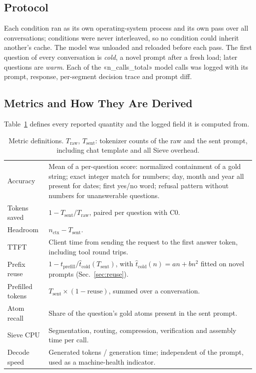\documentclass[journal]{IEEEtran}
\begin{document}
\subsection{Protocol}
Each condition ran as its own operating-system process and its own pass over all conversations; conditions were never interleaved,
so no condition could inherit another's cache. The model was unloaded and reloaded before each pass. The first question of every
conversation is \emph{cold}, a novel prompt after a fresh load; later questions are \emph{warm}. Each of the «n_calls_total» model
calls was logged with its prompt, response, per-segment decision trace and prompt diff.

\subsection{Metrics and How They Are Derived}
Table~\ref{tab:metrics} defines every reported quantity and the logged field it is computed from.
\begin{table}[t]\centering\caption{Metric definitions. $T_\text{raw}$, $T_\text{sent}$: tokenizer counts of the raw and the sent
prompt, including chat template and all Sieve overhead.}\label{tab:metrics}\scriptsize\setlength{\tabcolsep}{2.5pt}
\begin{tabular}{lp{}}\toprule
Accuracy & Mean of a per-question score: normalized containment of a gold string; exact integer match for numbers; day, month and year all present for dates; first yes/no word; refusal pattern without numbers for unanswerable questions.\\
Tokens saved & $1-T_\text{sent}/T_\text{raw}$, paired per question with C0.\\
Headroom & $n_\text{ctx}-T_\text{sent}$.\\
TTFT & Client time from sending the request to the first answer token, including tool round trips.\\
Prefix reuse & $1-t_\text{prefill}/\hat t_\text{cold}(T_\text{sent})$, with $\hat t_\text{cold}(n)=an+bn^2$ fitted on novel prompts (Sec.~\ref{sec:reuse}).\\
Prefilled tokens & $T_\text{sent}\times(1-\text{reuse})$, summed over a conversation.\\
Atom recall & Share of the question's gold atoms present in the sent prompt.\\
Sieve CPU & Segmentation, routing, compression, verification and assembly time per call.\\
Decode speed & Generated tokens / generation time; independent of the prompt, used as a machine-health indicator.\\
\bottomrule\end{tabular}\end{table}
\end{document}
